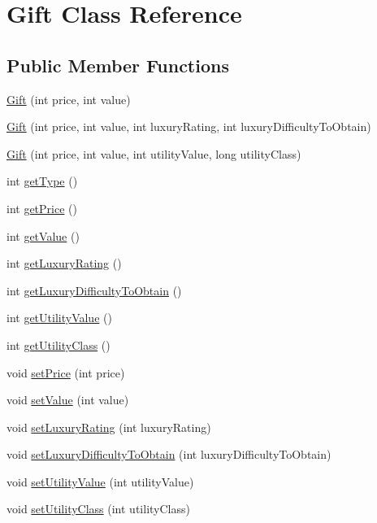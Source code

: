 \hypertarget{class_gift}{}\section{Gift Class Reference}
\label{class_gift}
\subsection*{Public Member Functions}
\begin{DoxyCompactItemize}
\item 
\hyperlink{class_gift_a3518b10b5b491f98a56e0b7d27736783}{Gift} (int price, int value)
\item 
\hyperlink{class_gift_a95ed6819ae16875595be9a0100f060de}{Gift} (int price, int value, int luxury\+Rating, int luxury\+Difficulty\+To\+Obtain)
\item 
\hyperlink{class_gift_a5f3dd07ba0552c716f3abc55d521e063}{Gift} (int price, int value, int utility\+Value, long utility\+Class)
\item 
int \hyperlink{class_gift_a999437028eda2a5aac1f3ad1c3f22cf9}{get\+Type} ()
\item 
int \hyperlink{class_gift_aa114ca9629b5f02e4df6731d33c69373}{get\+Price} ()
\item 
int \hyperlink{class_gift_aabddc4d671de70d9002461076999a574}{get\+Value} ()
\item 
int \hyperlink{class_gift_a13f625f3bf17ea98bdc61c0f824b77a4}{get\+Luxury\+Rating} ()
\item 
int \hyperlink{class_gift_aa7315f0e639d60a32c53eaaacddba937}{get\+Luxury\+Difficulty\+To\+Obtain} ()
\item 
int \hyperlink{class_gift_a109b572cc26b20b8b745b959afae678e}{get\+Utility\+Value} ()
\item 
int \hyperlink{class_gift_a16a1e01228fcd6de8fd4b607a854d2b7}{get\+Utility\+Class} ()
\item 
void \hyperlink{class_gift_a3e497fb858aade883c0b18c979963d83}{set\+Price} (int price)
\item 
void \hyperlink{class_gift_a40368c3ac78745ce67d3a2496ba3e9ce}{set\+Value} (int value)
\item 
void \hyperlink{class_gift_a40b64181f527757f46ae01441c6a73e4}{set\+Luxury\+Rating} (int luxury\+Rating)
\item 
void \hyperlink{class_gift_a6f03034c81bf5e709fd91078ef2d323b}{set\+Luxury\+Difficulty\+To\+Obtain} (int luxury\+Difficulty\+To\+Obtain)
\item 
void \hyperlink{class_gift_a3d29773a61661250ca59b63f28351d23}{set\+Utility\+Value} (int utility\+Value)
\item 
void \hyperlink{class_gift_afc8d4b95e2a9b81ddb5ccf098b217dfc}{set\+Utility\+Class} (int utility\+Class)
\end{DoxyCompactItemize}


